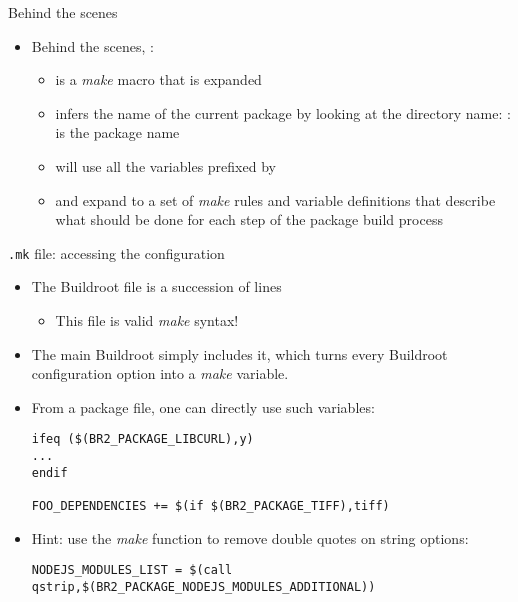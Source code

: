 \begin{frame}{Behind the scenes}
  \begin{itemize}
  \item Behind the scenes, :
    \begin{itemize}
    \item is a {\em make} macro that is expanded
    \item infers the name of the current package by looking at the
      directory name: :  is
      the package name
    \item will use all the variables prefixed by 
    \item and expand to a set of {\em make} rules and variable
      definitions that describe what should be done for each step of
      the package build process
    \end{itemize}
  \end{itemize}
\end{frame}

\begin{frame}[fragile]{{\tt .mk} file: accessing the configuration}

  \begin{itemize}
  \item The Buildroot  file is a succession of lines
    \begin{itemize}
    \item This file is valid {\em make} syntax!
    \end{itemize}
  \item The main Buildroot  simply includes it, which
    turns every Buildroot configuration option into a {\em make}
    variable.
  \item From a package  file, one can directly use such
    variables:
    \begin{block}{}
    \begin{verbatim}
ifeq ($(BR2_PACKAGE_LIBCURL),y)
...
endif

FOO_DEPENDENCIES += $(if $(BR2_PACKAGE_TIFF),tiff)
\end{verbatim}
\end{block}

\item Hint: use the {\em make}  function to remove double
  quotes on string options:
\begin{block}{}
  \begin{verbatim}
NODEJS_MODULES_LIST = $(call qstrip,$(BR2_PACKAGE_NODEJS_MODULES_ADDITIONAL))
  \end{verbatim}
\end{block}
  \end{itemize}
\end{frame}

